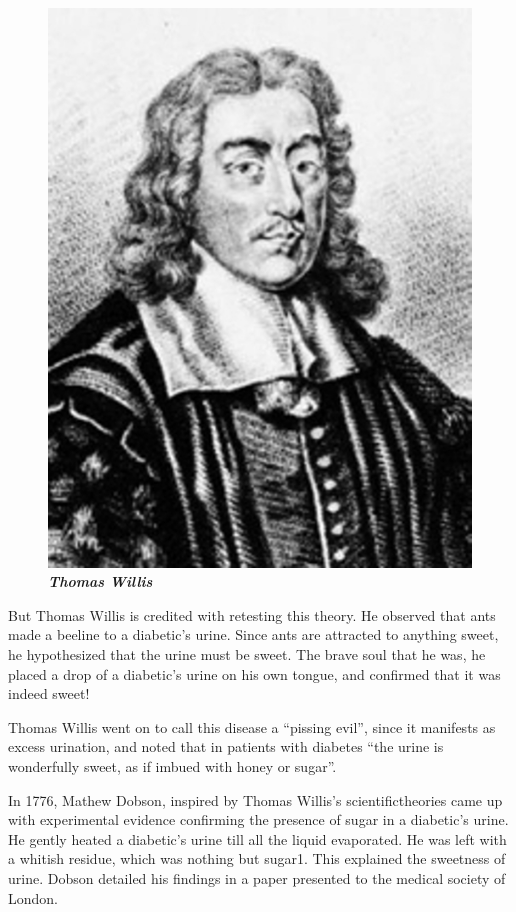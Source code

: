 \begin{figure}
\centering
\includegraphics[scale=.9]{images/007.jpg}\\
\textbf{\textit{Thomas Willis}}
\end{figure}

But Thomas Willis is credited with retesting this theory. He observed that ants made a beeline to a diabetic’s urine. Since ants are attracted to anything sweet, he hypothesized that the urine must be sweet. The brave soul that he was, he placed a drop of a diabetic’s urine on his own tongue, and confirmed that it was indeed sweet!

\clearpage

Thomas Willis went on to call this disease a “pissing evil”, since it manifests as excess urination, and noted that in patients with diabetes “the urine is wonderfully sweet, as if imbued with honey or sugar”.

In 1776, Mathew Dobson, inspired by Thomas Willis’s scientific\break theories came up with experimental evidence confirming the presence of sugar in a diabetic’s urine. He gently heated a diabetic’s urine till all the liquid evaporated. He was left with a whitish residue, which was nothing but sugar1. This explained the sweetness of urine. Dobson detailed his findings in a paper presented to the medical society of London.

